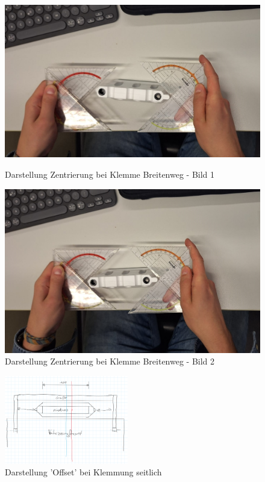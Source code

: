 \documentclass[../main.tex]{subfiles}
\begin{document}
            \begin{figure}[h!]
                \centering
                \begin{minipage}{0.48\textwidth}
                    \centering
                    \includegraphics[width=\linewidth]{img/konzeptfindung/klemme_breitenweg_zentrierung_1.jpeg}
                    \caption{Darstellung Zentrierung bei Klemme Breitenweg - Bild 1}
                    \label{img:konzept_zentrierung_1}
                \end{minipage}
                \hfill
                \begin{minipage}{0.48\textwidth}
                    \centering
                    \includegraphics[width=\linewidth]{img/konzeptfindung/klemme_breitenweg_zentrierung_2.jpeg}
                    \caption{Darstellung Zentrierung bei Klemme Breitenweg - Bild 2}
                    \label{img:konzept_zentrierung_2}
                \end{minipage}
            \end{figure}


        \begin{figure}[h!]
            \centering
            \includegraphics[width=0.48\textwidth]{img/konzeptfindung/Klemme_Langsweg_off_center.png}
            \caption{Darstellung 'Offset' bei Klemmung seitlich}
        \label{img:konzept_zentrierung_3}
        \end{figure}  
\end{document}
